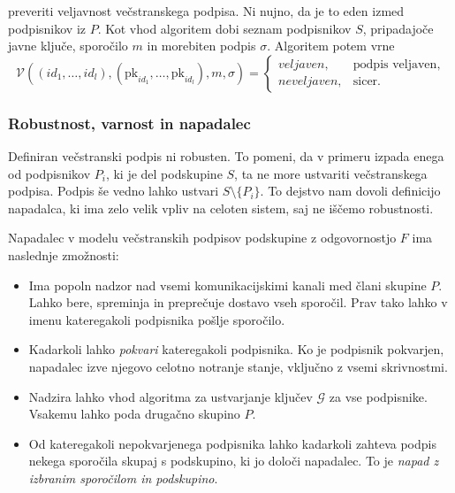 \documentclass[isrm2, tisk]{fmfdelo}
\begin{document}
\begin{definicija}
\begin{itemize}
            preveriti veljavnost večstranskega podpisa. Ni nujno, da je to eden izmed podpisnikov iz $P$. 
            Kot vhod algoritem dobi seznam podpisnikov $S$, pripadajoče javne ključe, sporočilo $m$ in 
            morebiten podpis $\sigma$. Algoritem potem vrne
            $$ 
            \mathcal{V}((id_1, \dots, id_l), (\text{pk}_{id_1}, \dots, \text{pk}_{id_l}), m, \sigma) = 
            \begin{cases}
                veljaven, & \text{podpis veljaven}, \\
                neveljaven, & \text{sicer}.
            \end{cases}
            $$
    \end{itemize}
\end{definicija}

\subsubsection{Robustnost, varnost in napadalec}
Definiran večstranski podpis ni robusten. To pomeni, da v primeru izpada enega od podpisnikov $P_i$,
ki je del podskupine $S$, ta ne more ustvariti večstranskega podpisa. Podpis še vedno lahko ustvari
$S \setminus \{P_i\}$. To dejstvo nam dovoli definicijo napadalca, ki ima zelo velik vpliv na celoten
sistem, saj ne iščemo robustnosti.

\begin{definicija}
\label{def:asm-napadalec}
    Napadalec v modelu večstranskih podpisov podskupine z odgovornostjo $F$ ima naslednje zmožnosti:
    \begin{itemize}
        \item Ima popoln nadzor nad vsemi komunikacijskimi kanali med člani skupine $P$. Lahko bere,
            spreminja in preprečuje dostavo vseh sporočil. Prav tako lahko v imenu kateregakoli
            podpisnika pošlje sporočilo.
        \item Kadarkoli lahko \textit{pokvari} kateregakoli podpisnika. Ko je podpisnik pokvarjen,
            napadalec izve njegovo celotno notranje stanje, vključno z vsemi skrivnostmi.
        \item Nadzira lahko vhod algoritma za ustvarjanje ključev $\mathcal{G}$ za vse podpisnike.
            Vsakemu lahko poda drugačno skupino $P$.
        \item Od kateregakoli nepokvarjenega podpisnika lahko kadarkoli zahteva podpis nekega sporočila
            skupaj s podskupino, ki jo določi napadalec. To je \textit{napad z izbranim sporočilom
            in podskupino}.
    \end{itemize}
\end{definicija}
\end{document}

